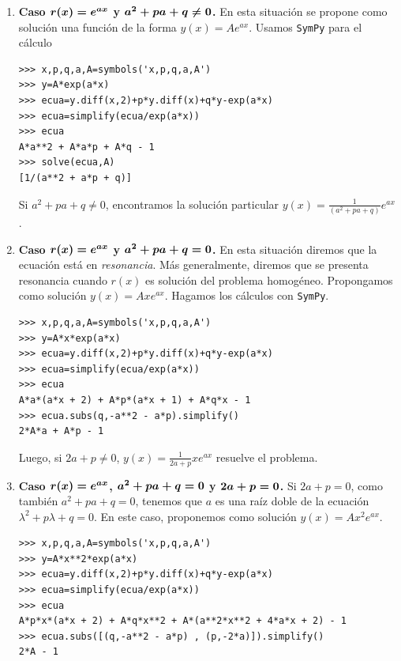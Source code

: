 \begin{enumerate}
\item \textbf{Caso $\boldsymbol{r(x)=e^{a x}}$ y $\boldsymbol{a^2+pa+q\neq 0}$.}
En esta situación se propone como solución una función de la forma $\boxed{y(x)=Ae^{ax}}$. Usamos \texttt{SymPy} para el cálculo
\begin{lstlisting}
>>> x,p,q,a,A=symbols('x,p,q,a,A')
>>> y=A*exp(a*x)
>>> ecua=y.diff(x,2)+p*y.diff(x)+q*y-exp(a*x)
>>> ecua=simplify(ecua/exp(a*x))
>>> ecua
A*a**2 + A*a*p + A*q - 1
>>> solve(ecua,A)
[1/(a**2 + a*p + q)]
\end{lstlisting}


Si $a^2+pa+q\neq 0$, encontramos la solución particular $\boxed{y(x)=\frac{1}{(a^2+pa+q)}e^{ax}}$.




\item \textbf{Caso $\boldsymbol{r(x)=e^{a x}}$ y $\boldsymbol{a^2+pa+q= 0}$.}
En esta situación diremos que la ecuación está en \emph{resonancia}. Más generalmente, diremos que se presenta resonancia cuando $r(x)$ es solución
del problema homogéneo.
Propongamos como solución $y(x)=Axe^{ax}$. Hagamos los cálculos con \texttt{SymPy}.


\begin{lstlisting}
>>> x,p,q,a,A=symbols('x,p,q,a,A')
>>> y=A*x*exp(a*x)
>>> ecua=y.diff(x,2)+p*y.diff(x)+q*y-exp(a*x)
>>> ecua=simplify(ecua/exp(a*x))
>>> ecua
A*a*(a*x + 2) + A*p*(a*x + 1) + A*q*x - 1
>>> ecua.subs(q,-a**2 - a*p).simplify()
2*A*a + A*p - 1

\end{lstlisting}

Luego, si $2a+p\neq 0$, $\boxed{y(x)=\frac{1}{2a+p}xe^{ax}}$ resuelve el problema.





\item \textbf{Caso $\boldsymbol{r(x)=e^{a x}}$, $\boldsymbol{a^2+pa+q= 0}$ y $ \boldsymbol{2a+p=0}$.}
Si $2a+p=0$, como también $a^2+pa+q=0$, tenemos que $a$ es una raíz doble de la ecuación $\lambda^2+p\lambda+q=0$.
En este caso, proponemos como solución $y(x)=Ax^2e^{ax}$.

\begin{lstlisting}
>>> x,p,q,a,A=symbols('x,p,q,a,A')
>>> y=A*x**2*exp(a*x)
>>> ecua=y.diff(x,2)+p*y.diff(x)+q*y-exp(a*x)
>>> ecua=simplify(ecua/exp(a*x))
>>> ecua
A*p*x*(a*x + 2) + A*q*x**2 + A*(a**2*x**2 + 4*a*x + 2) - 1
>>> ecua.subs([(q,-a**2 - a*p) , (p,-2*a)]).simplify()
2*A - 1
\end{lstlisting}


\end{enumerate}

